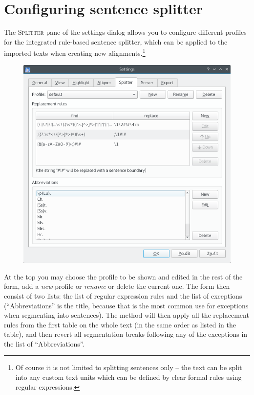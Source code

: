 \documentclass[a4paper,10pt,oneside]{book}
\newcommand{\menu}[1]{\textsc{#1}}
\begin{document}
\section{Configuring sentence splitter}\label{ch:detail:config:splitter}

The \menu{Splitter} pane of the settings dialog allows you to configure different profiles for the integrated rule-based sentence splitter, which can be applied to the imported texts when creating new alignments.\footnote{Of course it is not limited to splitting sentences only -- the text can be split into any custom text units which can be defined by clear formal rules using regular expressions.}

\begin{figure}[htb]
 \includegraphics[width=\textwidth]{screenshots/settings_splitter.png}
\end{figure}

At the top you may choose the profile to be shown and edited in the rest of the form, add a \emph{new} profile or \emph{rename} or delete the current one. The form then consist of two lists: the list of regular expression rules and the list of exceptions (``Abbreviations'' is the title, because that is the most common use for exceptions when segmenting into sentences). The method will then apply all the replacement rules from the first table on the whole text (in the same order as listed in the table), and then revert all segmentation breaks following any of the exceptions in the list of ``Abbreviations''.
\end{document}
